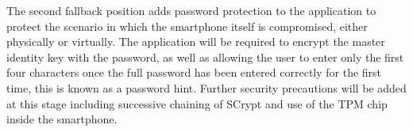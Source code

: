 The second fallback position adds password protection to the application to protect the scenario in which the smartphone itself is compromised, either physically or virtually. The application will be required to encrypt the master identity key with the password, as well as allowing the user to enter only the first four characters once the full password has been entered correctly for the first time, this is known as a password hint. Further security precautions will be added at this stage including successive chaining of SCrypt and use of the TPM chip inside the smartphone.
